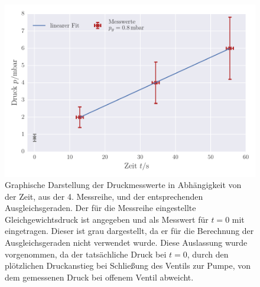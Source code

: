 \begin{figure}[!h]
 \centering
 \includegraphics[scale=0.65]{../Grafiken/Leckrate_Drehschieber_3.pdf}
 \caption{Graphische Darstellung der Druckmesswerte in Abhängigkeit von der Zeit, aus der 4. Messreihe, und der
 entsprechenden Ausgleichsgeraden. Der für die Messreihe eingestellte Gleichgewichtsdruck ist angegeben und als Messwert für $t=0$ mit eingetragen. Dieser ist grau dargestellt, da er für die 
 Berechnung der Ausgleichsgeraden nicht verwendet wurde. Diese Auslassung wurde vorgenommen, da
 der tatsächliche Druck bei $t=0$, durch den plötzlichen Druckanstieg bei Schließung des Ventils zur Pumpe, von dem
 gemessenen Druck bei offenem Ventil abweicht. \label{fig:leckrate_drehschieber_3}}
 \end{figure} 